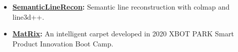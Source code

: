 \documentclass[11pt,a4paper,sans]{moderncv}        %
\begin{document}
\begin{itemize}


\item \textbf{\href{https://github.com/jianhengLiu/SV-SLAM}{SemanticLineRecon}:} Semantic line reconstruction with colmap and line3d++.






\item \textbf{\href{https://www.bilibili.com/video/BV1gb4y127by?share_source=copy_web}{MatRix}:} An intelligent carpet developed in 2020 XBOT PARK Smart Product Innovation Boot Camp.


\end{itemize}
\end{document}
